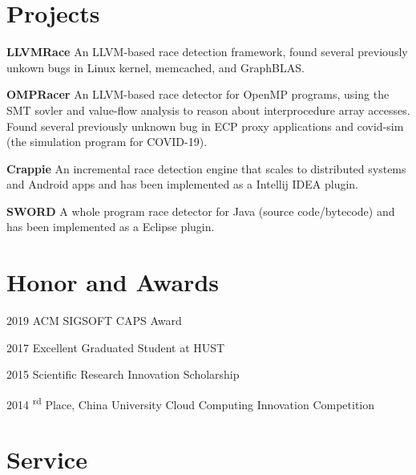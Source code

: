 \documentclass[12pt,letterpaper]{report}
\newcommand{\listtabwidth}{1.75cm}
\begin{document}
	\section*{Projects}
	
	\begin{tablist}
		\item[\textbf{LLVMRace}]
		\tab An LLVM-based race detection framework, found several previously unkown bugs in Linux kernel, memcached, and GraphBLAS.
		\item[\textbf{OMPRacer}] 
		\tab An LLVM-based race detector for OpenMP programs, 
		using the SMT sovler and value-flow analysis to reason about interprocedure array accesses.\\
		Found several previously unknown bug in ECP proxy applications and covid-sim (the simulation program for COVID-19).
		\item[\textbf{Crappie}] 
		\tab An incremental race detection engine that scales to distributed systems and Android apps and has been implemented as a Intellij IDEA plugin.
		\item[\textbf{SWORD}] 
		\tab A whole program race detector for Java (source code/bytecode) and has been implemented as a Eclipse plugin.
	\end{tablist}
\renewcommand{\listtabwidth}{1.75cm}


\section*{Honor and Awards}

\begin{tablist}
	\item[2019] \tab ACM SIGSOFT CAPS Award
	\item[2017] \tab Excellent Graduated Student at HUST
	\item[2015] \tab Scientific Research Innovation Scholarship
	\item[2014] \textsuperscript{rd} Place, China University Cloud Computing Innovation Competition
\end{tablist}


	
	\section*{Service}
	
\end{document}
